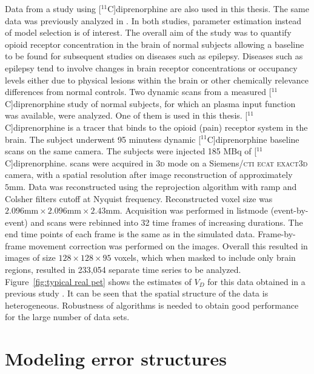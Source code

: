 Data from a \pet study using [$^{11}$C]diprenorphine are also used in this
thesis. The same data was previously analyzed in
\cite{Peng:2008fx,Jiang:2009kf}. In both studies, parameter estimation
instead of model selection is of interest. The overall aim of the study was
to quantify opioid receptor concentration in the brain of normal subjects
allowing a baseline to be found for subsequent studies on diseases such as
epilepsy. Diseases such as epilepsy tend to involve changes in brain receptor
concentrations or occupancy levels either due to physical lesions within the
brain or other chemically relevance differences from normal controls. Two
dynamic scans from a measured [$^{11}$C]diprenorphine study of normal
subjects, for which an plasma input function was available, were analyzed.
One of them is used in this thesis. [$^{11}$C]diprenorphine is a tracer that
binds to the opioid (pain) receptor system in the brain. The subject
underwent 95 minutess dynamic [$^{11}$C]diprenorphine \pet baseline scans on
the same camera. The subjects were injected 185 MBq of
[$^{11}$C]diprenorphine. \pet scans were acquired in \textsc{3d} mode on a
Siemens/\textsc{cti ecat exact3d} \pet camera, with a spatial resolution
after image reconstruction of approximately $5\text{mm}$. Data was
reconstructed using the reprojection algorithm \citep{Kinahan1989} with ramp
and Colsher filters cutoff at Nyquist frequency. Reconstructed voxel size
was $2.096 \text{mm} \times 2.096 \text{mm} \times2.43 \text{mm}$.
Acquisition was performed in listmode (event-by-event) and scans were
rebinned into 32 time frames of increasing durations. The end time points of
each frame is the same as in the simulated data. Frame-by-frame movement
correction was performed on the \pet images. Overall this resulted in images
of size $128\times128\times95$ voxels, which when masked to include only
brain regions, resulted in 233,054 separate time series to be analyzed.
Figure~\ref{fig:typical real pet} shows the estimates of $V_D$ for this data
obtained in a previous study \cite{Zhou2013}. It can be seen that the spatial
structure of the data is heterogeneous. Robustness of algorithms is needed to
obtain good performance for the large number of data sets.



\section{Modeling error structures}
\label{sec:Error models}

